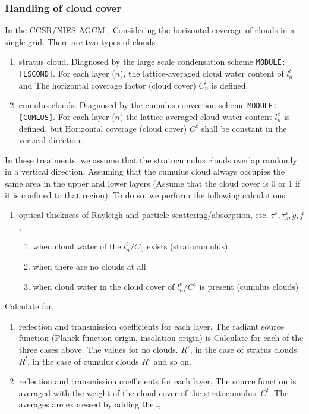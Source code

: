 \hypertarget{handling-of-cloud-cover}{%
\subsubsection{Handling of cloud cover}\label{handling-of-cloud-cover}}

In the CCSR/NIES AGCM , Considering the horizontal coverage of clouds in
a single grid. There are two types of clouds

\begin{enumerate}
\def\labelenumi{\arabic{enumi}.}
\item
  stratus cloud. Diagnosed by the large scale condensation scheme
  \texttt{MODULE:{[}LSCOND{]}}. For each layer (\(n\)), the
  lattice-averaged cloud water content of \(l^l_n\) and The horizontal
  coverage factor (cloud cover) \(C^l_n\) is defined.
\item
  cumulus clouds. Diagnosed by the cumulus convection scheme
  \texttt{MODULE:{[}CUMLUS{]}}. For each layer (\(n\)) the
  lattice-averaged cloud water content \(l^c_n\) is defined, but
  Horizontal coverage (cloud cover) \(C^c\) shall be constant in the
  vertical direction.
\end{enumerate}

In these treatments, we assume that the stratocumulus clouds overlap
randomly in a vertical direction, Assuming that the cumulus cloud always
occupies the same area in the upper and lower layers (Assume that the
cloud cover is 0 or 1 if it is confined to that region). To do so, we
perform the following calculations.

\begin{enumerate}
\def\labelenumi{\arabic{enumi}.}
\item
  optical thickness of Rayleigh and particle scattering/absorption, etc.
  \(\tau^s, \tau_s^s, g, f\),

  \begin{enumerate}
  \def\labelenumii{\arabic{enumii}.}
  \item
    when cloud water of the \(l^l_n/C^l_n\) exists (stratocumulus)
  \item
    when there are no clouds at all
  \item
    when cloud water in the cloud cover of \(l^c_n/C^c\) is present
    (cumulus clouds)
  \end{enumerate}
\end{enumerate}

Calculate for.

\begin{enumerate}
\def\labelenumi{\arabic{enumi}.}
\setcounter{enumi}{1}
\item
  reflection and transmission coefficients for each layer, The radiant
  source function (Planck function origin, insolation origin) is
  Calculate for each of the three cases above. The values for no clouds.
  \(R^\circ\), in the case of stratus clouds \(R^l\), in the case of
  cumulus clouds \(R^c\) and so on.
\item
  reflection and transmission coefficients for each layer, The source
  function is averaged with the weight of the cloud cover of the
  stratocumulus, \(C^l\). The averages are expressed by adding the
  \(\bar{}\),
\end{enumerate}

